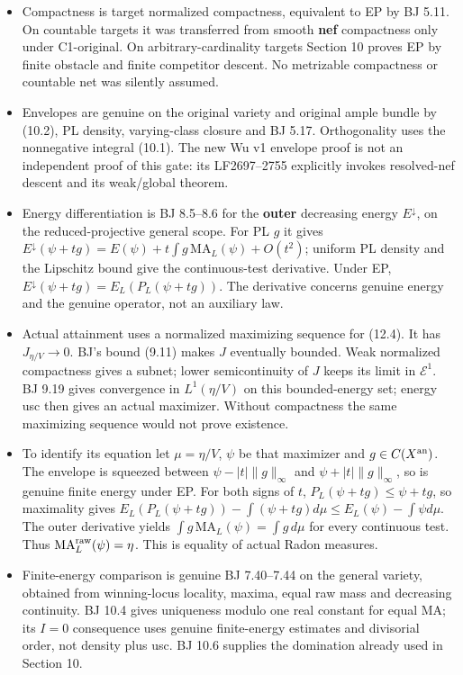 \documentclass[
  10pt,
]{article}
\providecommand{\tightlist}{%
  \setlength{\itemsep}{0pt}\setlength{\parskip}{0pt}}
\begin{document}
\begin{itemize}
\tightlist
\item
  Compactness is target normalized compactness, equivalent to EP by BJ
  5.11. On countable targets it was transferred from smooth \textbf{nef}
  compactness only under C1-original. On arbitrary-cardinality targets
  Section 10 proves EP by finite obstacle and finite competitor descent.
  No metrizable compactness or countable net was silently assumed.
\item
  Envelopes are genuine on the original variety and original ample
  bundle by (10.2), PL density, varying-class closure and BJ 5.17.
  Orthogonality uses the nonnegative integral (10.1). The new Wu v1
  envelope proof is not an independent proof of this gate: its
  LF2697--2755 explicitly invokes resolved-nef descent and its
  weak/global theorem.
\item
  Energy differentiation is BJ 8.5--8.6 for the \textbf{outer}
  decreasing energy \(E^\downarrow\), on the reduced-projective general
  scope. For PL \(g\) it gives
  \(E^\downarrow(\psi+tg)=E(\psi)+t\int g\,\mathrm{MA}_L(\psi)+O(t^2)\);
  uniform PL density and the Lipschitz bound give the continuous-test
  derivative. Under EP, \(E^\downarrow(\psi+tg)=E_L(P_L(\psi+tg))\). The
  derivative concerns genuine energy and the genuine operator, not an
  auxiliary law.
\item
  Actual attainment uses a normalized maximizing sequence for (12.4). It
  has \(J_{\eta/V}\to0\). BJ's bound (9.11) makes \(J\) eventually
  bounded. Weak normalized compactness gives a subnet; lower
  semicontinuity of \(J\) keeps its limit in \(\mathcal E^1\). BJ 9.19
  gives convergence in \(L^1(\eta/V)\) on this bounded-energy set;
  energy usc then gives an actual maximizer. Without compactness the
  same maximizing sequence would not prove existence.
\item
  To identify its equation let \(\mu=\eta/V\), \(\psi\) be that
  maximizer and \(g\in C(X^{\rm an})\). The envelope is squeezed between
  \(\psi-|t|\|g\|_\infty\) and \(\psi+|t|\|g\|_\infty\), so is genuine
  finite energy under EP. For both signs of \(t\),
  \(P_L(\psi+tg)\le\psi+tg\), so maximality gives
  \(E_L(P_L(\psi+tg))-\int(\psi+tg)d\mu\le E_L(\psi)-\int\psi d\mu\).
  The outer derivative yields
  \(\int g\,\mathrm{MA}_L(\psi)=\int g\,d\mu\) for every continuous
  test. Thus \(\mathrm{MA}^{\rm raw}_L(\psi)=\eta\). This is equality of
  actual Radon measures.
\item
  Finite-energy comparison is genuine BJ 7.40--7.44 on the general
  variety, obtained from winning-locus locality, maxima, equal raw mass
  and decreasing continuity. BJ 10.4 gives uniqueness modulo one real
  constant for equal MA; its \(I=0\) consequence uses genuine
  finite-energy estimates and divisorial order, not density plus usc. BJ
  10.6 supplies the domination already used in Section 10.
\end{itemize}
\end{document}
